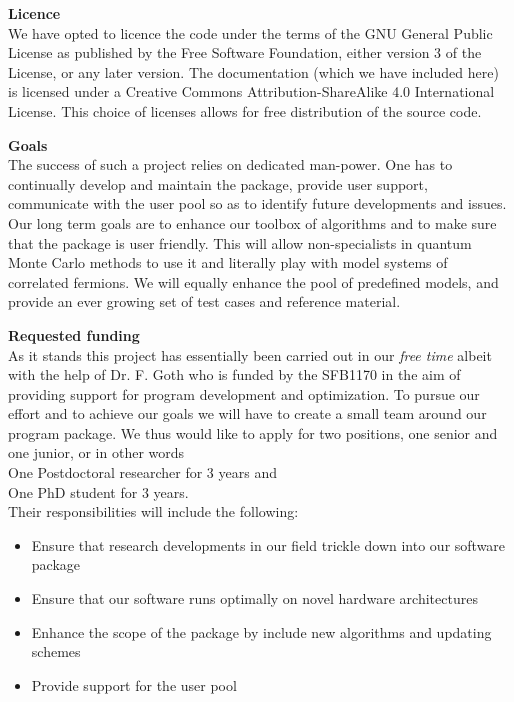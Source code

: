 \documentclass[12pt]{article}
\begin{document}
{\bf Licence} \\ 
We have opted to licence the code under  the terms of the GNU General Public License as published by
the Free Software Foundation, either version 3 of the License, or any later version.   The documentation (which we have included here)  is licensed under a Creative Commons Attribution-ShareAlike 4.0 International License.  This choice of licenses allows for free distribution of the source code. 


 
{\bf Goals } \\
The success of such a project relies on dedicated man-power. One has to continually develop and  maintain the package, provide user support, communicate with the user pool so as to identify  future developments and issues.   Our long term  goals  are  to enhance  our toolbox of algorithms  and to  make sure that the package is user friendly. This will allow  non-specialists  in quantum Monte Carlo methods to  use it and literally play with model systems of correlated fermions.  We will equally  enhance the pool of predefined models, and provide an ever growing set of test cases and reference material. 

{\bf Requested funding } \\
As it stands this project has essentially been carried out in our {\it free time}  albeit with the help of  Dr. F. Goth who is funded by the SFB1170   in the aim of providing support for program development and optimization. To pursue our effort  and to achieve our goals we will have to create a small team around our program package.  We thus would like to apply for two positions, one senior and one junior, or in other words \\

One Postdoctoral researcher for 3 years  and \\
One PhD student for 3 years. \\

Their responsibilities will include the following:
\begin{itemize}
\item   Ensure that  research developments in our field  trickle down into our software package
\item   Ensure that our software runs optimally on novel hardware architectures 
\item   Enhance the scope of the package by include new algorithms  and updating schemes
\item   Provide support for the user pool
\end{itemize}
\end{document}
